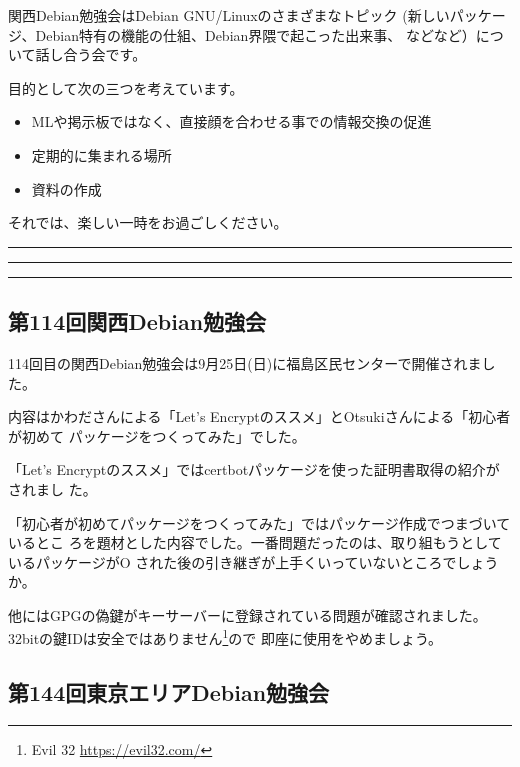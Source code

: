 \documentclass[mingoth,a4paper]{jsarticle}
\begin{document}
\vspace{1em}

関西Debian勉強会はDebian GNU/Linuxのさまざまなトピック
(新しいパッケージ、Debian特有の機能の仕組、Debian界隈で起こった出来事、
などなど）について話し合う会です。

目的として次の三つを考えています。
\begin{itemize}
\item MLや掲示板ではなく、直接顔を合わせる事での情報交換の促進
\item 定期的に集まれる場所
\item 資料の作成
\end{itemize}

それでは、楽しい一時をお過ごしください。

\newpage

\begin{minipage}[b]{0.2\hsize}
  {}
\end{minipage}
\begin{minipage}[b]{0.8\hsize}
\hrule
\vspace{2mm}
\hrule
\setcounter{tocdepth}{1}
\tableofcontents
\vspace{2mm}
\hrule
\end{minipage}


\subsection{第114回関西Debian勉強会}

114回目の関西Debian勉強会は9月25日(日)に福島区民センターで開催されました。

内容はかわださんによる「Let's Encryptのススメ」とOtsukiさんによる「初心者が初めて
パッケージをつくってみた」でした。

「Let's Encryptのススメ」ではcertbotパッケージを使った証明書取得の紹介がされまし
た。

「初心者が初めてパッケージをつくってみた」ではパッケージ作成でつまづいているとこ
ろを題材とした内容でした。一番問題だったのは、取り組もうとしているパッケージがO
された後の引き継ぎが上手くいっていないところでしょうか。

他にはGPGの偽鍵がキーサーバーに登録されている問題が確認されました。
32bitの鍵IDは安全ではありません\footnote{Evil 32 \url{https://evil32.com/}}ので
即座に使用をやめましょう。


\subsection{第144回東京エリアDebian勉強会}
\end{document}
